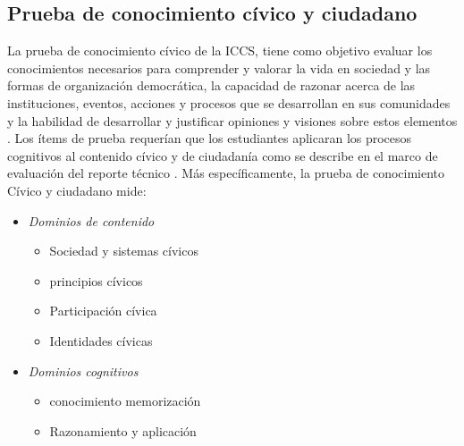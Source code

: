 \documentclass[12pt,twoside]{templates/facsothesis}
\providecommand{\tightlist}{%
  \setlength{\itemsep}{0pt}\setlength{\parskip}{0pt}}
\begin{document}
\hypertarget{prueba-de-conocimiento-cuxedvico-y-ciudadano}{%
\subsection{Prueba de conocimiento cívico y ciudadano}\label{prueba-de-conocimiento-cuxedvico-y-ciudadano}}

La prueba de conocimiento cívico de la ICCS, tiene como objetivo evaluar los conocimientos necesarios para comprender y valorar la vida en sociedad y las formas de organización democrática, la capacidad de razonar acerca de las instituciones, eventos, acciones y procesos que se desarrollan en sus comunidades y la habilidad de desarrollar y justificar opiniones y visiones sobre estos elementos \citep{schulzInitialFindsIEA2010}. Los ítems de prueba requerían que los estudiantes aplicaran los procesos cognitivos al contenido cívico y de ciudadanía como se describe en el marco de evaluación del reporte técnico \citep{schulzICCS2016Technical2016}. Más específicamente, la prueba de conocimiento Cívico y ciudadano mide:

\begin{itemize}
\tightlist
\item
  \emph{Dominios de contenido}

  \begin{itemize}
  \tightlist
  \item
    Sociedad y sistemas cívicos
  \item
    principios cívicos
  \item
    Participación cívica
  \item
    Identidades cívicas
  \end{itemize}
\item
  \emph{Dominios cognitivos}

  \begin{itemize}
  \tightlist
  \item
    conocimiento memorización
  \item
    Razonamiento y aplicación
  \end{itemize}
\end{itemize}
\end{document}
